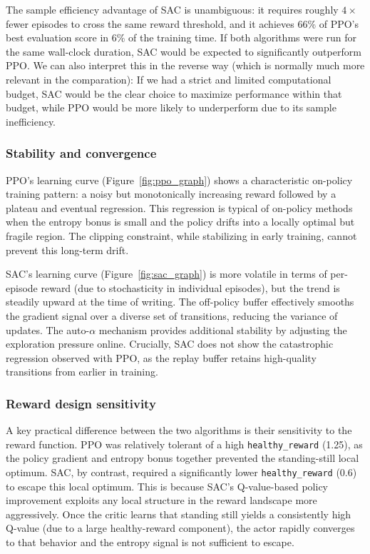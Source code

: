 \documentclass[onecolumn]{cwpreport} %
\begin{document}
The sample efficiency advantage of SAC is unambiguous: it requires roughly $4\times$ fewer episodes to cross the same reward threshold, and it achieves 66\% of PPO's best evaluation score in 6\% of the training time. If both algorithms were run for the same wall-clock duration, SAC would be expected to significantly outperform PPO. We can also interpret this in the reverse way (which is normally much more relevant in the comparation): If we had a strict and limited computational budget, SAC would be the clear choice to maximize performance within that budget, while PPO would be more likely to underperform due to its sample inefficiency.

\subsubsection{Stability and convergence}

PPO's learning curve (Figure~\ref{fig:ppo_graph}) shows a characteristic on-policy training pattern: a noisy but monotonically increasing reward followed by a plateau and eventual regression. This regression is typical of on-policy methods when the entropy bonus is small and the policy drifts into a locally optimal but fragile region. The clipping constraint, while stabilizing in early training, cannot prevent this long-term drift.

SAC's learning curve (Figure~\ref{fig:sac_graph}) is more volatile in terms of per-episode reward (due to stochasticity in individual episodes), but the trend is steadily upward at the time of writing. The off-policy buffer effectively smooths the gradient signal over a diverse set of transitions, reducing the variance of updates. The auto-$\alpha$ mechanism provides additional stability by adjusting the exploration pressure online. Crucially, SAC does not show the catastrophic regression observed with PPO, as the replay buffer retains high-quality transitions from earlier in training.

\subsubsection{Reward design sensitivity}

A key practical difference between the two algorithms is their sensitivity to the reward function. PPO was relatively tolerant of a high \texttt{healthy\_reward} (1.25), as the policy gradient and entropy bonus together prevented the standing-still local optimum. SAC, by contrast, required a significantly lower \texttt{healthy\_reward} (0.6) to escape this local optimum. This is because SAC's Q-value-based policy improvement exploits any local structure in the reward landscape more aggressively. Once the critic learns that standing still yields a consistently high Q-value (due to a large healthy-reward component), the actor rapidly converges to that behavior and the entropy signal is not sufficient to escape.
\end{document}
